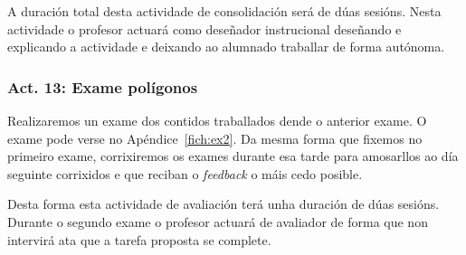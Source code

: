 A duración total desta actividade de consolidación será de dúas sesións. Nesta actividade o profesor actuará como deseñador instrucional deseñando e explicando a actividade e deixando ao alumnado traballar de forma autónoma.

\subsubsection{Act. 13: Exame polígonos}\label{act:examen2}
Realizaremos un exame dos contidos traballados dende o anterior exame. O exame pode verse no Apéndice~\ref{fich:ex2}. Da mesma forma que fixemos no primeiro exame, corrixiremos os exames durante esa tarde para amosarllos ao día seguinte corrixidos e que reciban o \emph{feedback} o máis cedo posible.

Desta forma esta actividade de avaliación terá unha duración de dúas sesións. Durante o segundo exame o profesor actuará de avaliador de forma que non intervirá ata que a tarefa proposta se complete.
